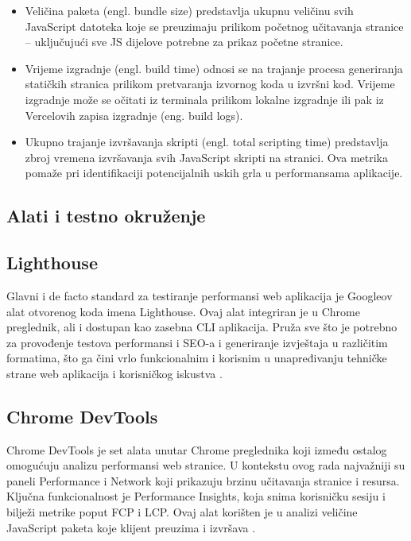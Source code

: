 \begin{itemize}
    \item Veličina paketa (engl. bundle size) predstavlja ukupnu veličinu svih JavaScript datoteka koje se preuzimaju prilikom početnog učitavanja stranice – uključujući sve JS dijelove potrebne za prikaz početne stranice.
    \item Vrijeme izgradnje (engl. build time) odnosi se na trajanje procesa generiranja statičkih stranica prilikom pretvaranja izvornog koda u izvršni kod. Vrijeme izgradnje može se očitati iz terminala prilikom lokalne izgradnje ili pak iz Vercelovih zapisa izgradnje (eng. build logs).
    \item Ukupno trajanje izvršavanja skripti (engl. total scripting time) predstavlja zbroj vremena izvršavanja svih JavaScript skripti na stranici. Ova metrika pomaže pri identifikaciji potencijalnih uskih grla u performansama aplikacije.
\end{itemize}

\subsection{Alati i testno okruženje}

\subsection{Lighthouse}

Glavni i de facto standard za testiranje performansi web aplikacija je Googleov alat otvorenog koda imena Lighthouse. Ovaj alat integriran je u Chrome preglednik, ali i dostupan kao zasebna CLI aplikacija. Pruža sve što je potrebno za provođenje testova performansi i SEO-a i generiranje izvještaja u različitim formatima, što ga čini vrlo funkcionalnim i korisnim u unapređivanju tehničke strane web aplikacija i korisničkog iskustva \cite{googlelighthouse}.

\subsection{Chrome DevTools}

Chrome DevTools je set alata unutar Chrome preglednika koji između ostalog omogućuju analizu performansi web stranice. U kontekstu ovog rada najvažniji su paneli Performance i Network koji prikazuju brzinu učitavanja stranice i resursa. Ključna funkcionalnost je Performance Insights, koja snima korisničku sesiju i bilježi metrike poput FCP i LCP. Ovaj alat korišten je u analizi veličine JavaScript paketa koje klijent preuzima i izvršava \cite{nordstrom2023comparison}.

